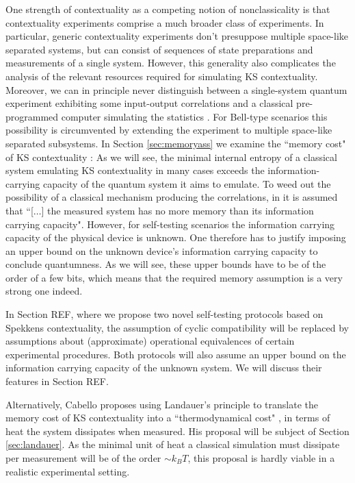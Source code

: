 One strength of contextuality as a competing notion of nonclassicality is that contextuality experiments comprise a much broader class of experiments. In particular, generic contextuality experiments don't presuppose multiple space-like separated systems, but can consist of sequences of state preparations and measurements of a single system. However, this generality also complicates the analysis of the relevant resources required for simulating KS contextuality. Moreover, we can in principle never distinguish between a single-system quantum experiment exhibiting some input-output correlations and a classical pre-programmed computer simulating the statistics \cite{Supic2020}. For Bell-type scenarios this possibility is circumvented by extending the experiment to multiple space-like separated subsystems. In Section \ref{sec:memoryass} we examine the ``memory cost" of KS contextuality \cite{Cabello2018,Kleinmann2011}: As we will see, the minimal internal entropy of a classical system emulating KS contextuality in many cases exceeds the information-carrying capacity of the quantum system it aims to emulate. To weed out the possibility of a classical mechanism producing the correlations, in \cite{Bharti2019} it is assumed that ``[$\dots$] the measured system has no more memory than its information carrying capacity".
However, for self-testing scenarios the information carrying capacity of the physical device is unknown.
One therefore has to justify imposing an upper bound on the unknown device's information carrying capacity to conclude quantumness. As we will see, these upper bounds have to be of the order of a few bits, which means that the required memory assumption is a very strong one indeed. 

In Section REF, where we propose two novel self-testing protocols based on Spekkens contextuality, the assumption of cyclic compatibility will be replaced by assumptions about (approximate) operational equivalences of certain experimental procedures. Both protocols will also assume an upper bound on the information carrying capacity of the unknown system. We will discuss their features in Section REF.

Alternatively, Cabello proposes using Landauer's principle \cite{Cabello2018} to translate the memory cost of KS contextuality into a ``thermodynamical cost" \cite{Wiesner2012,Cabello2016}, in terms of heat the system dissipates when measured. His proposal will be subject of Section \ref{sec:landauer}. As the minimal unit of heat a classical simulation must dissipate per measurement will be of the order $\sim k_BT$, this proposal is hardly viable in a realistic experimental setting.


